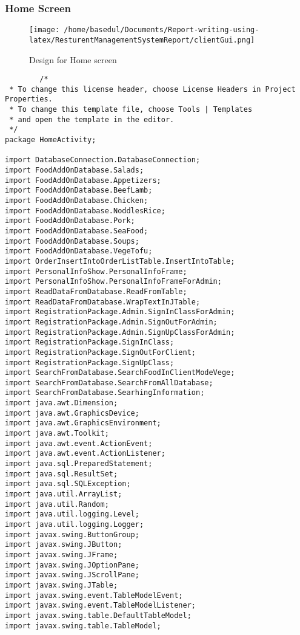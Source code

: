 \documentclass[12pt,a4paper]{article}
\begin{document}
	\subsubsection{Home Screen}
		\begin{figure}[H]
		\centering
		\texttt{[image: /home/basedul/Documents/Report-writing-using-latex/ResturentManagementSystemReport/clientGui.png]}
		\caption{Design for Home screen}
		\label{fig:homescreen} 
\end{figure}
	\begin{lstlisting}
		/*
 * To change this license header, choose License Headers in Project Properties.
 * To change this template file, choose Tools | Templates
 * and open the template in the editor.
 */
package HomeActivity;

import DatabaseConnection.DatabaseConnection;
import FoodAddOnDatabase.Salads;
import FoodAddOnDatabase.Appetizers;
import FoodAddOnDatabase.BeefLamb;
import FoodAddOnDatabase.Chicken;
import FoodAddOnDatabase.NoddlesRice;
import FoodAddOnDatabase.Pork;
import FoodAddOnDatabase.SeaFood;
import FoodAddOnDatabase.Soups;
import FoodAddOnDatabase.VegeTofu;
import OrderInsertIntoOrderListTable.InsertIntoTable;
import PersonalInfoShow.PersonalInfoFrame;
import PersonalInfoShow.PersonalInfoFrameForAdmin;
import ReadDataFromDatabase.ReadFromTable;
import ReadDataFromDatabase.WrapTextInJTable;
import RegistrationPackage.Admin.SignInClassForAdmin;
import RegistrationPackage.Admin.SignOutForAdmin;
import RegistrationPackage.Admin.SignUpClassForAdmin;
import RegistrationPackage.SignInClass;
import RegistrationPackage.SignOutForClient;
import RegistrationPackage.SignUpClass;
import SearchFromDatabase.SearchFoodInClientModeVege;
import SearchFromDatabase.SearchFromAllDatabase;
import SearchFromDatabase.SearhingInformation;
import java.awt.Dimension;
import java.awt.GraphicsDevice;
import java.awt.GraphicsEnvironment;
import java.awt.Toolkit;
import java.awt.event.ActionEvent;
import java.awt.event.ActionListener;
import java.sql.PreparedStatement;
import java.sql.ResultSet;
import java.sql.SQLException;
import java.util.ArrayList;
import java.util.Random;
import java.util.logging.Level;
import java.util.logging.Logger;
import javax.swing.ButtonGroup;
import javax.swing.JButton;
import javax.swing.JFrame;
import javax.swing.JOptionPane;
import javax.swing.JScrollPane;
import javax.swing.JTable;
import javax.swing.event.TableModelEvent;
import javax.swing.event.TableModelListener;
import javax.swing.table.DefaultTableModel;
import javax.swing.table.TableModel;


\end{lstlisting}
\end{document}
